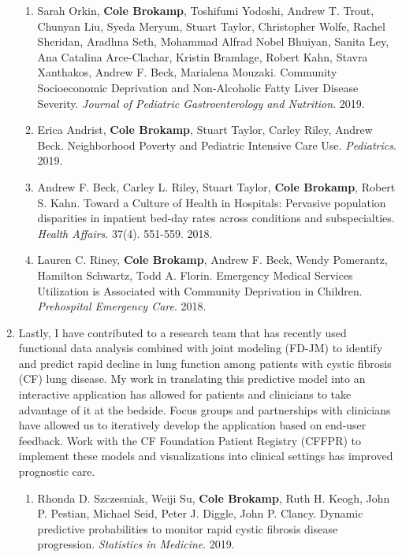 \documentclass{nihbiosketch}
\begin{document}
\begin{enumerate}
\begin{enumerate}
  \item Sarah Orkin, \textbf{Cole Brokamp}, Toshifumi Yodoshi, Andrew T. Trout,
  Chunyan Liu, Syeda Meryum, Stuart Taylor, Christopher Wolfe, Rachel
  Sheridan, Aradhna Seth, Mohammad Alfrad Nobel Bhuiyan, Sanita Ley, Ana
  Catalina Arce-Clachar, Kristin Bramlage, Robert Kahn, Stavra Xanthakos,
  Andrew F. Beck, Marialena Mouzaki. Community Socioeconomic Deprivation
  and Non-Alcoholic Fatty Liver Disease Severity. \emph{Journal of
    Pediatric Gastroenterology and Nutrition}. 2019.

  \item Erica Andrist, \textbf{Cole Brokamp}, Stuart Taylor, Carley Riley,
  Andrew Beck. Neighborhood Poverty and Pediatric Intensive Care Use.
  \textit{Pediatrics}. 2019.

	\item Andrew F. Beck, Carley L. Riley, Stuart Taylor, \textbf{Cole Brokamp},
    Robert S. Kahn. Toward a Culture of Health in Hospitals: Pervasive
    population disparities in inpatient bed-day rates across conditions and
    subspecialties. \textit{Health Affairs}. 37(4). 551-559. 2018.
		
	\item Lauren C. Riney, \textbf{Cole Brokamp}, Andrew F. Beck, Wendy Pomerantz,
    Hamilton Schwartz, Todd A. Florin. Emergency Medical Services Utilization is
    Associated with Community Deprivation in Children. \textit{Prehospital
      Emergency Care}. 2018.

\end{enumerate}

\item Lastly, I have contributed to a research team that has recently used
  functional data analysis combined with joint modeling (FD-JM) to identify and
  predict rapid decline in lung function among patients with cystic fibrosis
  (CF) lung disease. My work in translating this predictive model into an interactive application has allowed for patients and clinicians to take advantage of it at the bedside.  Focus groups and partnerships with clinicians have allowed us to iteratively develop the application based on end-user feedback. Work with the CF Foundation Patient Registry (CFFPR) to implement these models and visualizations into clinical settings has improved prognostic care.

\begin{enumerate}
	
  \item Rhonda D. Szczesniak, Weiji Su, \textbf{Cole Brokamp}, Ruth H. Keogh,
  John P. Pestian, Michael Seid, Peter J. Diggle, John P. Clancy. Dynamic
  predictive probabilities to monitor rapid cystic fibrosis disease
  progression. \emph{Statistics in Medicine}. 2019.


\end{enumerate}
\end{enumerate}
\end{document}
